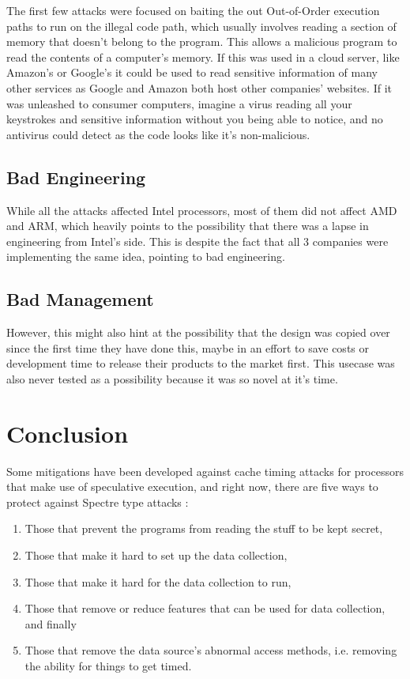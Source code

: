 \documentclass[12pt]{article}
\begin{document}
The first few attacks were focused on baiting the out Out-of-Order execution paths to run on the illegal code path, which usually involves reading a section of memory that doesn't belong to the program. This allows a malicious program to read the contents of a computer's memory. If this was used in a cloud server, like Amazon's or Google's it could be used to read sensitive information of many other services as Google and Amazon both host other companies' websites. If it was unleashed to consumer computers, imagine a virus reading all your keystrokes and sensitive information without you being able to notice, and no antivirus could detect as the code looks like it's non-malicious.

\subsection*{Bad Engineering}

While all the attacks affected Intel processors, most of them did not affect AMD and ARM, which heavily points to the possibility that there was a lapse in engineering from Intel's side. This is despite the fact that all 3 companies were implementing the same idea, pointing to bad engineering.

\subsection*{Bad Management}

However, this might also hint at the possibility that the design was copied over since the first time they have done this, maybe in an effort to save costs or development time to release their products to the market first. This usecase was also never tested as a possibility because it was so novel at it's time.

\section*{Conclusion}

Some mitigations have been developed against cache timing attacks for processors that make use of speculative execution, and right now, there are five ways to protect against Spectre type attacks \cite[Sec.~2C]{Paper:DAWG}:
\begin{enumerate}
    \item Those that prevent the programs from reading the stuff to be kept secret,
    \item Those that make it hard to set up the data collection,
    \item Those that make it hard for the data collection to run,
    \item Those that remove or reduce features that can be used for data collection, and finally
    \item Those that remove the data source's abnormal access methods, i.e. removing the ability for things to get timed.
\end{enumerate}
\end{document}
